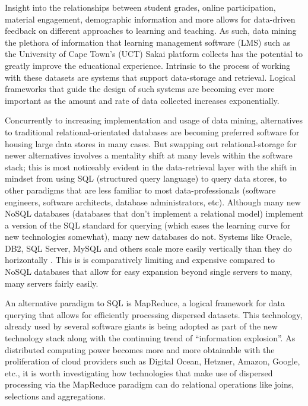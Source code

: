 Insight into the relationships between student grades, online participation, material engagement, demographic information and more allows for data-driven feedback on different approaches to learning and teaching. As such, data mining the plethora of information that learning management software (LMS) such as the University of Cape Town's (UCT) Sakai platform \cite{sakai} collects has the potential to greatly improve the educational experience. Intrinsic to the process of working with these datasets are systems that support data-storage and retrieval. Logical frameworks that guide the design of such systems are becoming ever more important as the amount and rate of data collected increases exponentially.

Concurrently to increasing implementation and usage of data mining, alternatives to traditional relational-orientated databases are becoming preferred software for housing large data stores in many cases. But swapping out relational-storage for newer alternatives involves a mentality shift at many levels within the software stack; this is most noticeably evident in the data-retrieval layer with the shift in mindset from using SQL (structured query language) to query data stores, to other paradigms that are less familiar to most data-professionals (software engineers, software architects, database administrators, etc). Although many new NoSQL databases (databases that don't implement a relational model) implement a version of the SQL standard for querying (which eases the learning curve for new technologies somewhat), many new databases do not. Systems like Oracle, DB2, SQL Server, MySQL and others scale more easily vertically than they do horizontally \cite{couchbaseWhitePaper}. This is is comparatively limiting and expensive compared to NoSQL databases that allow for easy expansion beyond single servers to many, many servers fairly easily.

An alternative paradigm to SQL is MapReduce, a logical framework for data querying that allows for efficiently processing dispersed datasets. This technology, already used by several software giants \cite{chandar2010} is being adopted as part of the new technology stack along with the continuing trend of ``information explosion''. As distributed computing power becomes more and more obtainable with the proliferation of cloud providers such as Digital Ocean, Hetzner, Amazon, Google, etc., it is worth investigating how technologies that make use of dispersed processing via the MapReduce paradigm can do relational operations like joins, selections and aggregations.

